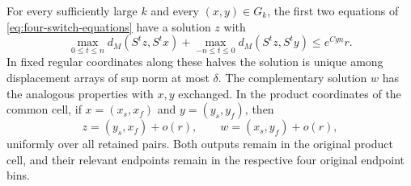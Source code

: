 \begin{lemma}\label{lem:switch-orbits}
For every sufficiently large $k$ and every $(x,y)\in G_k$, the first
two equations of \eqref{eq:four-switch-equations} have a solution $z$
with
\begin{equation}\label{eq:sharp-shadow}
 \max_{0\le t\le n}d_M(S^tz,S^tx)
 +\max_{-n\le t\le0}d_M(S^tz,S^ty)
 \le e^{Cgn}r.
\end{equation}
In fixed regular coordinates along these halves the solution is unique
among displacement arrays of sup norm at most $\delta$.
The complementary solution $w$ has the analogous properties with $x,y$
exchanged.  In the product coordinates of the common cell, if
$x=(x_s,x_f)$ and $y=(y_s,y_f)$, then
\begin{equation}\label{eq:ideal-switch}
 z=(y_s,x_f)+o(r),\qquad w=(x_s,y_f)+o(r),
\end{equation}
uniformly over all retained pairs.  Both outputs remain in the original
product cell, and their relevant endpoints remain in the respective
four original endpoint bins.
\end{lemma}


